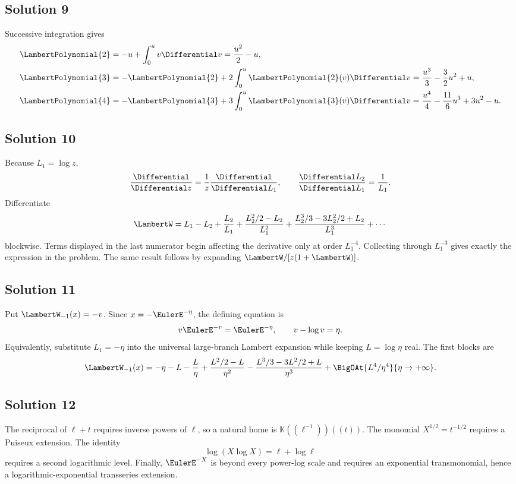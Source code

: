 \documentclass[11pt,oneside,openany]{book}
\newcommand{\K}{\mathbb{K}}
\begin{document}
\subsection*{Solution 9}
Successive integration gives
\begin{align*}
 \LambertPolynomial{2}&=-u+\int_0^u v\Differential v=\frac{u^2}{2}-u,\\
 \LambertPolynomial{3}&=-\LambertPolynomial{2}+2\int_0^u\LambertPolynomial{2}(v)\Differential v
 =\frac{u^3}{3}-\frac32u^2+u,\\
 \LambertPolynomial{4}&=-\LambertPolynomial{3}+3\int_0^u\LambertPolynomial{3}(v)\Differential v
 =\frac{u^4}{4}-\frac{11}{6}u^3+3u^2-u.
\end{align*}

\subsection*{Solution 10}
Because \(L_1=\log z\),
\[
 \frac{\Differential}{\Differential z}=\frac1z\frac{\Differential}{\Differential L_1},
 \qquad
 \frac{\Differential L_2}{\Differential L_1}=\frac1{L_1}.
\]
Differentiate
\[
 \LambertW=L_1-L_2+\frac{L_2}{L_1}
 +\frac{L_2^2/2-L_2}{L_1^2}
 +\frac{L_2^3/3-3L_2^2/2+L_2}{L_1^3}+\cdots
\]
blockwise.  Terms displayed in the last numerator begin affecting the
derivative only at order \(L_1^{-4}\).  Collecting through
\(L_1^{-3}\) gives exactly the expression in the problem.  The same result
follows by expanding \(\LambertW/[z(1+\LambertW)]\).

\subsection*{Solution 11}
Put \(\LambertW_{-1}(x)=-v\).  Since \(x=-\EulerE^{-\eta}\), the defining equation is
\[
 v\EulerE^{-v}=\EulerE^{-\eta},
 \qquad v-\log v=\eta.
\]
Equivalently, substitute \(L_1=-\eta\) into the universal large-branch
Lambert expansion while keeping \(L=\log\eta\) real.  The first blocks are
\[
 \LambertW_{-1}(x)
 =-\eta-L-\frac{L}{\eta}
 +\frac{L^2/2-L}{\eta^2}
 -\frac{L^3/3-3L^2/2+L}{\eta^3}
 +\BigOAt{L^4/\eta^4}{\eta\to+\infty}.
\]

\subsection*{Solution 12}
The reciprocal of \(\ell+t\) requires inverse powers of \(\ell\), so a
natural home is \(\K((\ell^{-1}))((t))\).  The monomial
\(X^{1/2}=t^{-1/2}\) requires a Puiseux extension.  The identity
\[
 \log(X\log X)=\ell+\log\ell
\]
requires a second logarithmic level.  Finally, \(\EulerE^{-X}\) is beyond every
power-log scale and requires an exponential transmonomial, hence a
logarithmic-exponential transseries extension.
\end{document}
